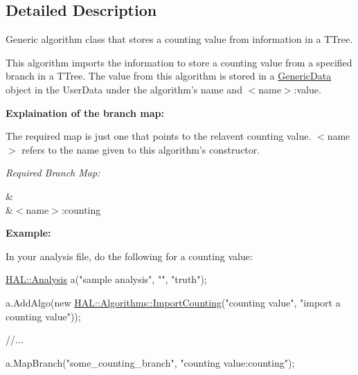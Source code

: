 \subsection{Detailed Description}
Generic algorithm class that stores a counting value from information in a T\-Tree. 

This algorithm imports the information to store a counting value from a specified branch in a T\-Tree. The value from this algorithm is stored in a \hyperlink{class_h_a_l_1_1_generic_data}{Generic\-Data} object in the User\-Data under the algorithm's name and $<$name$>$\-:value.\par
\par
 {\bfseries Explaination of the branch map\-:}\par
 The required map is just one that points to the relavent counting value. $<$name$>$ refers to the name given to this algorithm's constructor.\par
 {\itshape Required Branch Map\-:} \begin{TabularC}{2}
\hline
{}&\PBS{}\\
&\PBS\centering $<$name$>$\-:counting \\
\end{TabularC}
{\bfseries Example\-:}\par
 In your analysis file, do the following for a counting value\-:


\begin{DoxyCode}
\hyperlink{class_h_a_l_1_1_analysis}{HAL::Analysis} a(\textcolor{stringliteral}{"sample analysis"}, \textcolor{stringliteral}{""}, \textcolor{stringliteral}{"truth"});

a.AddAlgo(\textcolor{keyword}{new} \hyperlink{class_h_a_l_1_1_algorithms_1_1_import_counting}{HAL::Algorithms::ImportCounting}(\textcolor{stringliteral}{"counting value"}, \textcolor{stringliteral}{"import a
       counting value"}));

\textcolor{comment}{//...}

a.MapBranch(\textcolor{stringliteral}{"some\_counting\_branch"}, \textcolor{stringliteral}{"counting value:counting"});
\end{DoxyCode}
 

